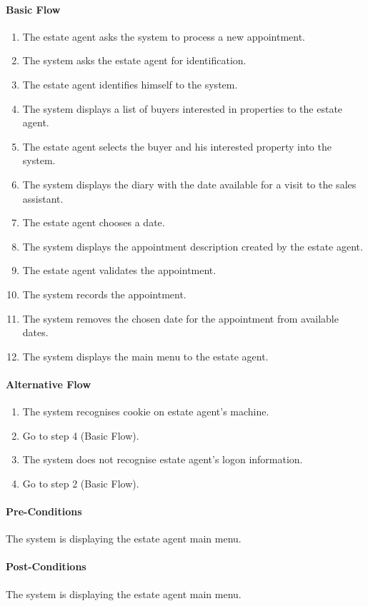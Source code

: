 \documentclass[a4paper,12pt]{article}
\begin{document}
\paragraph{Basic Flow}
\begin{enumerate}
\item The estate agent asks the system to process a new appointment.
\item The system asks the estate agent for identification.
\item The estate agent identifies himself to the system.
\item The system displays a list of buyers interested in properties to the estate agent.
\item The estate agent selects the buyer and his interested property into the system.
\item The system displays the diary with the date available for a visit to the sales assistant.
\item The estate agent chooses a date.
\item The system displays the appointment description created by the estate agent.
\item The estate agent validates the appointment.
\item The system records the appointment.
\item The system removes the chosen date for the appointment from available dates.
\item The system displays the main menu to the estate agent.
\end{enumerate}
\paragraph{Alternative Flow}
\begin{enumerate}
\item The system recognises cookie on estate agent's machine.
\item Go to step 4 (Basic Flow).
\item The system does not recognise estate agent's logon information.
\item Go to step 2 (Basic Flow).
\end{enumerate}
\paragraph{Pre-Conditions}
The system is displaying the estate agent main menu.
\paragraph{Post-Conditions}
The system is displaying the estate agent main menu.
\end{document}
